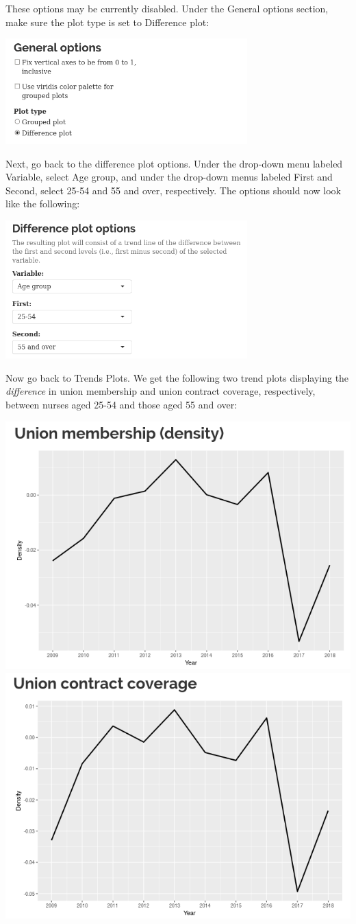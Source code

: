 \documentclass[letterpaper,12pt]{article}
\begin{document}
\begin{enumerate}
\begin{center}
  \end{center}
  These options may be currently disabled. Under the General options
  section, make sure the plot type is set to Difference plot:
  \begin{center}
    \includegraphics[width=0.7\textwidth]{images/trends_ex2/options_plot_type.png}
  \end{center}
  Next, go back to the difference plot options. Under the drop-down
  menu labeled Variable, select Age group, and under the drop-down
  menus labeled First and Second, select 25-54 and 55 and over,
  respectively. The options should now look like the following:
  \begin{center}
    \includegraphics[width=0.7\textwidth]{images/trends_ex2/options_diff_plots2.png}
  \end{center}
  Now go back to Trends \textrightarrow{} Plots. We get the following
  two trend plots displaying the \emph{difference} in union membership
  and union contract coverage, respectively, between nurses aged 25-54
  and those aged 55 and over:
  \begin{center}
    \includegraphics[width=0.49\linewidth]{images/trends_ex2/membership_trend.png}
    \includegraphics[width=0.49\linewidth]{images/trends_ex2/coverage_trend.png}
  \end{center}


\end{enumerate}
\end{document}
